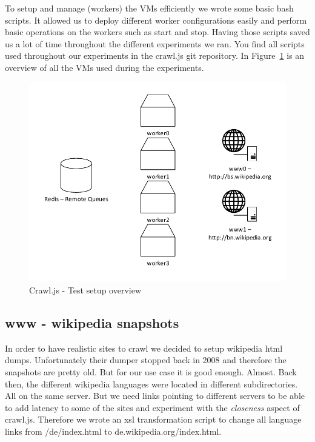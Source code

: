 To setup and manage (workers) the VMs efficiently we wrote some basic bash scripts. It allowed us to deploy different worker configurations easily and perform basic operations on the workers such as start and stop. Having those scripts saved us a lot of time throughout the different experiments we ran. You find all scripts used throughout our experiments in the crawl.js git repository. In Figure~\ref{test_setup} is an overview of all the VMs used during the experiments.

\begin{figure}[h]
\centering
  \includegraphics[width=1.0\textwidth]{Figures/experiments_setup.pdf}
\caption{Crawl.js - Test setup overview}
\label{test_setup}
\end{figure}

\subsection{www - wikipedia snapshots}
In order to have realistic sites to crawl we decided to setup wikipedia html dumps. Unfortunately their dumper stopped back in 2008 and therefore the snapshots are pretty old. But for our use case it is good enough. Almost. Back then, the different wikipedia languages were located in different subdirectories. All on the same server. But we need links pointing to different servers to be able to add latency to some of the sites and experiment with the \emph{closeness} aspect of crawl.js. Therefore we wrote an xsl transformation script to change all language links from /de/index.html to de.wikipedia.org/index.html.



